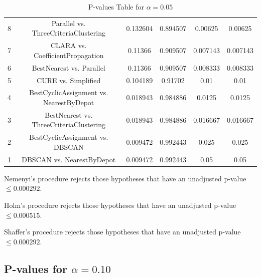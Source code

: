 \documentclass[a4paper,10pt]{article}
\begin{document}
\begin{landscape}
\begin{table}[!htp]
\begin{tabular}{cccccc}
8&Parallel vs. ThreeCriteriaClustering&0.132604&0.894507&0.00625&0.00625\\
7&CLARA vs. CoefficientPropagation&0.11366&0.909507&0.007143&0.007143\\
6&BestNearest vs. Parallel&0.11366&0.909507&0.008333&0.008333\\
5&CURE vs. Simplified&0.104189&0.91702&0.01&0.01\\
4&BestCyclicAssignment vs. NearestByDepot&0.018943&0.984886&0.0125&0.0125\\
3&BestNearest vs. ThreeCriteriaClustering&0.018943&0.984886&0.016667&0.016667\\
2&BestCyclicAssignment vs. DBSCAN&0.009472&0.992443&0.025&0.025\\
1&DBSCAN vs. NearestByDepot&0.009472&0.992443&0.05&0.05\\
\hline
\end{tabular}
\caption{P-values Table for $\alpha=0.05$}
\end{table}Nemenyi's procedure rejects those hypotheses that have an unadjusted p-value $\le0.000292$.

Holm's procedure rejects those hypotheses that have an unadjusted p-value $\le0.000515$.

Shaffer's procedure rejects those hypotheses that have an unadjusted p-value $\le0.000292$.

\pagebreak

\subsection{P-values for $\alpha=0.10$}


\end{landscape}
\end{document}
